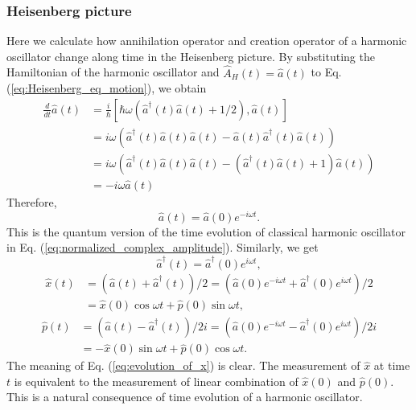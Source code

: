 \documentclass{book}
\begin{document}
\subsubsection{Heisenberg picture}
Here we calculate how annihilation operator and creation operator of a harmonic oscillator change along time in the Heisenberg picture. By substituting the Hamiltonian of the harmonic oscillator and $\hat A_H(t) = \hat a(t)$ to Eq. (\ref{eq:Heisenberg_eq_motion}), we obtain
\begin{equation}
\begin{aligned}
  \frac{d}{dt}\hat a(t) &= \frac{i}{\hbar}[\hbar\omega(\hat a^\dagger(t)\hat a(t) + 1/2), \hat a(t)]\\
  &= i\omega \left(\hat a^\dagger(t)\hat a(t)\hat a(t)-\hat a(t)\hat a^\dagger(t)\hat a(t)\right)\\
  &= i\omega \left(\hat a^\dagger(t)\hat a(t)\hat a(t)-(\hat a^\dagger(t)\hat a(t)+1)\hat a(t)\right)\\
  &= -i\omega \hat a(t)
\end{aligned}
\end{equation}
Therefore, 
\begin{equation}
  \hat a(t) = \hat a(0)e^{-i\omega t}.
  \label{eq:time_evolution_of_annihilation_operator}
\end{equation}
This is the quantum version of the time evolution of classical harmonic oscillator in Eq. (\ref{eq:normalized_complex_amplitude}). Similarly, we get
\begin{equation}
  \hat a^\dagger(t) = \hat a^\dagger(0)e^{i\omega t},
  \label{eq:time_evolution_of_creation_operator}
\end{equation}
\begin{equation}
\begin{aligned}
  \hat x(t) &= (\hat a(t) + \hat a^\dagger(t))/2
  = (\hat a(0)e^{-i\omega t} + \hat a^\dagger(0)e^{i\omega t})/2\\
  &= \hat x(0) \cos\omega t + \hat p(0) \sin \omega t,
  \label{eq:evolution_of_x}
\end{aligned}
\end{equation}
\begin{equation}
\begin{aligned}
  \hat p(t) &= (\hat a(t) - \hat a^\dagger(t))/2i
  = (\hat a(0)e^{-i\omega t} - \hat a^\dagger(0)e^{i\omega t})/2i\\
  &= -\hat x(0) \sin\omega t + \hat p(0) \cos \omega t.
\end{aligned}
\end{equation}
The meaning of Eq. (\ref{eq:evolution_of_x}) is clear. The measurement of $\hat x$ at time $t$ is equivalent to the measurement of linear combination of $\hat x(0)$ and $\hat p(0)$. This is a natural consequence of time evolution of a harmonic oscillator.
\end{document}
